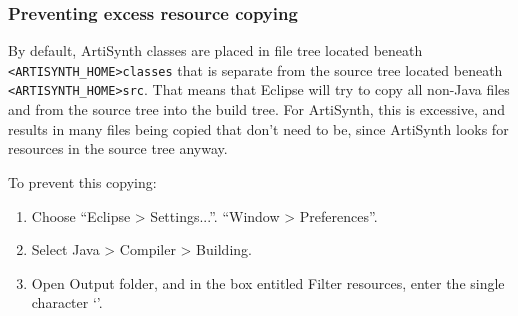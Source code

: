 \subsubsection{Preventing excess resource copying}

By default, ArtiSynth classes are placed in file tree located beneath
{\tt <ARTISYNTH\_HOME>\SEP classes} that is separate from the source
tree located beneath {\tt <ARTISYNTH\_HOME>\SEP src}.
That means that Eclipse will try to copy all non-Java files and
\directories{} from the source tree into the build tree. For ArtiSynth,
this is excessive, and results in many files being copied that don't
need to be, since ArtiSynth looks for resources in the source tree
anyway.

To prevent this copying:

\begin{enumerate}

\item Choose
\ifMacOS
``{\sf Eclipse > Settings...}''.
\else
``{\sf Window > Preferences}''.
\fi

\item Select {\sf Java > Compiler > Building}.

\item Open {\sf Output folder}, and in the box entitled {\sf Filter resources},
  enter the single character `{\tt *}'.

\end{enumerate}

%
%

